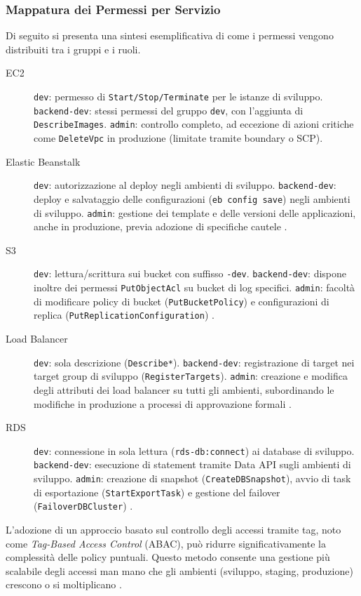 \subsubsection{Mappatura dei Permessi per Servizio}
\label{subsubsec:mappa_servizi_iam}
Di seguito si presenta una sintesi esemplificativa di come i permessi vengono distribuiti tra i gruppi e i ruoli.
\begin{description}
  \item[EC2] \texttt{dev}: permesso di \texttt{Start/Stop/Terminate} per le istanze di sviluppo. \texttt{backend-dev}: stessi permessi del gruppo \texttt{dev}, con l'aggiunta di \texttt{DescribeImages}. \texttt{admin}: controllo completo, ad eccezione di azioni critiche come \texttt{DeleteVpc} in produzione (limitate tramite boundary o SCP).
  \item[Elastic Beanstalk] \texttt{dev}: autorizzazione al deploy negli ambienti di sviluppo. \texttt{backend-dev}: deploy e salvataggio delle configurazioni (\texttt{eb config save}) negli ambienti di sviluppo. \texttt{admin}: gestione dei template e delle versioni delle applicazioni, anche in produzione, previa adozione di specifiche cautele \cite{AWSEBRole}.
  \item[S3] \texttt{dev}: lettura/scrittura sui bucket con suffisso \texttt{-dev}. \texttt{backend-dev}: dispone inoltre dei permessi \texttt{PutObjectAcl} su bucket di log specifici. \texttt{admin}: facoltà di modificare policy di bucket (\texttt{PutBucketPolicy}) e configurazioni di replica (\texttt{PutReplicationConfiguration}) \cite{AWSS3Security}.
  \item[Load Balancer] \texttt{dev}: sola descrizione (\texttt{Describe*}). \texttt{backend-dev}: registrazione di target nei target group di sviluppo (\texttt{RegisterTargets}). \texttt{admin}: creazione e modifica degli attributi dei load balancer su tutti gli ambienti, subordinando le modifiche in produzione a processi di approvazione formali \cite{AWSELBIAM}.
  \item[RDS] \texttt{dev}: connessione in sola lettura (\texttt{rds-db:connect}) ai database di sviluppo. \texttt{backend-dev}: esecuzione di statement tramite Data API sugli ambienti di sviluppo. \texttt{admin}: creazione di snapshot (\texttt{CreateDBSnapshot}), avvio di task di esportazione (\texttt{StartExportTask}) e gestione del failover (\texttt{FailoverDBCluster}) \cite{AWSRDSIAM}.
\end{description}
L'adozione di un approccio basato sul controllo degli accessi tramite tag, noto come \emph{Tag-Based Access Control} (ABAC), può ridurre significativamente la complessità delle policy puntuali. Questo metodo consente una gestione più scalabile degli accessi man mano che gli ambienti (sviluppo, staging, produzione) crescono o si moltiplicano \cite{AWSEC2IAM,AWSELBIAM}.

